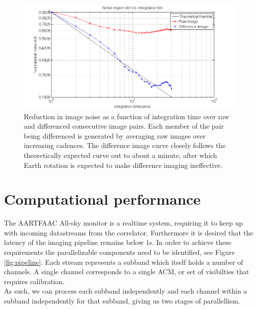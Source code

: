 \documentclass{aa}
\begin{document}
\begin{figure}[tbh]
\includegraphics[width=1\columnwidth]{Figs/raw_vs_diff_vs_theory}

\caption{\label{fig:Reduction-in-image}Reduction in image noise as a function of
  integration  time over  raw  and differenced  consecutive  image pairs.   Each
  member of the pair being differenced is generated by averaging raw images over
  increasing  cadences.   The  difference   image  curve  closely   follows  the
  theoretically expected curve out to about a minute, after which Earth rotation
  is expected to make difference imaging ineffective.}
\end{figure}


\section{\label{sec:Computational-performance}Computational performance}
The AARTFAAC All-sky monitor is a realtime system, requiring it to keep up with
incoming datastreams from the correlator. Furthermore it is desired that the
latency of the imaging pipeline remains below $1$s. In order to achieve these
requirements the parallelizable components need to be identified, see Figure
\ref{fig:pipeline}. Each stream represents a subband which itself holds a
number of channels. A single channel corresponds to a single ACM, or set of
visibilties that requires calibration. \\ 
As such, we can process each subband independently and each channel within a
subband independently for that subband, giving us two stages of parallellism.
\end{document}
